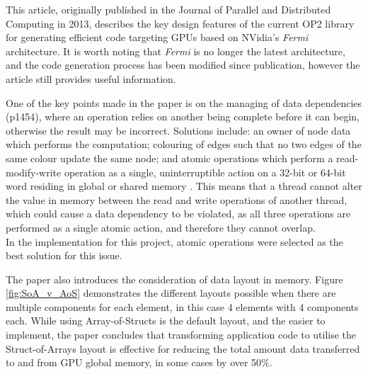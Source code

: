 This article, originally published in the Journal of Parallel and Distributed Computing in 2013, describes the key design features of the current OP2 library for generating efficient code targeting GPUs based on NVidia’s \textit{Fermi} architecture. It is worth noting that \textit{Fermi} is no longer the latest architecture, and the code generation process has been modified since publication, however the article still provides useful information.
\par
One of the key points made in the paper is on the managing of data dependencies (p1454), where an operation relies on another being complete before it can begin, otherwise the result may be incorrect. Solutions include: an owner of node data which performs the computation; colouring of edges such that no two edges of the same colour update the same node; and atomic operations which perform a read-modify-write operation as a single, uninterruptible action on a 32-bit or 64-bit word residing in global or shared memory \cite[p96]{guide}. This means that a thread cannot alter the value in memory between the read and write operations of another thread, which could cause a data dependency to be violated, as all three operations are performed as a single atomic action, and therefore they cannot overlap. \\In the implementation for this project, atomic operations were selected as the best solution for this issue.
\par
The paper also introduces the consideration of data layout in memory. Figure \ref{fig:SoA_v_AoS} demonstrates the different layouts possible when there are multiple components for each element, in this case 4 elements with 4 components each. While using Array-of-Structs is the default layout, and the easier to implement, the paper concludes that transforming application code to utilise the Struct-of-Arrays layout is effective for reducing the total amount data transferred to and from GPU global memory, in some cases by over 50\%.


